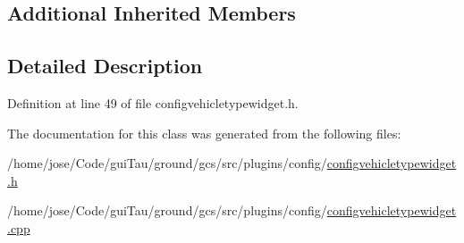 \subsection*{Additional Inherited Members}


\subsection{Detailed Description}


Definition at line 49 of file configvehicletypewidget.\-h.



The documentation for this class was generated from the following files\-:\begin{DoxyCompactItemize}
\item 
/home/jose/\-Code/gui\-Tau/ground/gcs/src/plugins/config/\hyperlink{configvehicletypewidget_8h}{configvehicletypewidget.\-h}\item 
/home/jose/\-Code/gui\-Tau/ground/gcs/src/plugins/config/\hyperlink{configvehicletypewidget_8cpp}{configvehicletypewidget.\-cpp}\end{DoxyCompactItemize}
